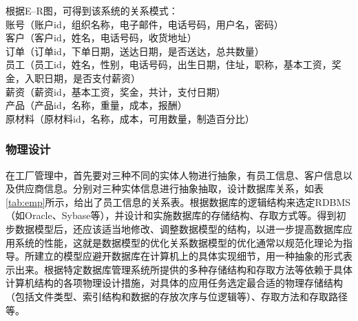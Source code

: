 根据E--R图，可得到该系统的关系模式：\\
账号（账户id，组织名称，电子邮件，电话号码，用户名，密码）\\
客户（客户id，姓名，电话号码，收货地址）\\
订单（订单id，下单日期，送达日期，是否送达，总共数量）\\
员工（员工id，姓名，性别，电话号码，出生日期，住址，职称，基本工资，奖金，入职日期，是否支付薪资）\\
薪资（薪资id，基本工资，奖金，共计，支付日期）\\
产品（产品id，名称，重量，成本，报酬）\\
原材料（原材料id，名称，成本，可用数量，制造百分比）

\subsubsection{物理设计}

在工厂管理中，首先要对三种不同的实体人物进行抽象，有员工信息、客户信息以及供应商信息。分别对三种实体信息进行抽象抽取，设计数据库关系，如表\ref{tab:emp}所示，给出了员工信息的关系表。根据数据库的逻辑结构来选定RDBMS（如Oracle、Sybase等），并设计和实施数据库的存储结构、存取方式等。得到初步数据模型后，还应该适当地修改、调整数据模型的结构，以进一步提高数据库应用系统的性能，这就是数据模型的优化关系数据模型的优化通常以规范化理论为指导。所建立的模型应避开数据库在计算机上的具体实现细节，用一种抽象的形式表示出来。根据特定数据库管理系统所提供的多种存储结构和存取方法等依赖于具体计算机结构的各项物理设计措施，对具体的应用任务选定最合适的物理存储结构（包括文件类型、索引结构和数据的存放次序与位逻辑等）、存取方法和存取路径等。

